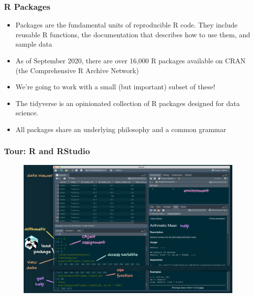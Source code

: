 \documentclass[11pt]{beamer}
\begin{document}
\begin{frame}
\begin{minipage}[t]{0.5\linewidth}
	\end{minipage}
	\end{frame}


\begin{frame}
	
	
	\frametitle{\textbf{R Packages}}
	
	\begin{itemize}
		\item Packages are the fundamental units of reproducible R code. They include reusable R functions, the documentation that describes how to use them, and sample data
		\item As of September 2020, there are over 16,000 R packages available on CRAN (the Comprehensive R Archive Network)
		\item We're going to work with a small (but important) subset of these!
		\item The tidyverse is an opinionated collection of R packages designed for data science.
		\item All packages share an underlying philosophy and a common grammar
	\end{itemize}
\end{frame}


\begin{frame}
	
	
	\frametitle{\textbf{Tour: R and RStudio}}
	
\begin{figure}
	\centering
	\includegraphics[width=0.75\linewidth]{Images/S1/tour-r-rstudio}
	\label{fig:tour-r-rstudio}
\end{figure}

\end{frame}
\end{document}
